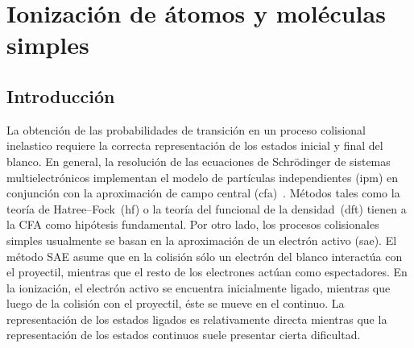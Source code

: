 \chapter{Ionización de átomos y moléculas simples}
\label{chap:iondim}

\section{Introducción}


La obtención de las probabilidades de transición en un proceso 
colisional inelastico requiere la correcta representación de los estados 
inicial y final del blanco. En general, la resolución de las ecuaciones 
de Schr\"odinger de sistemas multielectrónicos implementan el modelo 
de partículas independientes (\acs{ipm}) en conjunción con la 
aproximación de campo central (\acs{cfa})~\cite{Bransden:03,Cowan:81}. 
Métodos tales como la teoría de Hatree--Fock~(\acs{hf}) o la teoría del 
funcional de la densidad~(\acs{dft}) tienen a la CFA como hipótesis 
fundamental. Por otro lado, los procesos colisionales simples usualmente 
se basan en la aproximación de un electrón activo (\acs{sae}). El método 
SAE asume que en la colisión sólo un electrón del blanco interactúa con 
el proyectil, mientras que el resto de los electrones actúan como 
espectadores. En la ionización, el electrón activo se encuentra 
inicialmente ligado, mientras que luego de la colisión con el proyectil, 
éste se mueve en el continuo. La representación de los estados ligados 
es relativamente directa mientras que la representación de los estados 
continuos suele presentar cierta dificultad.


